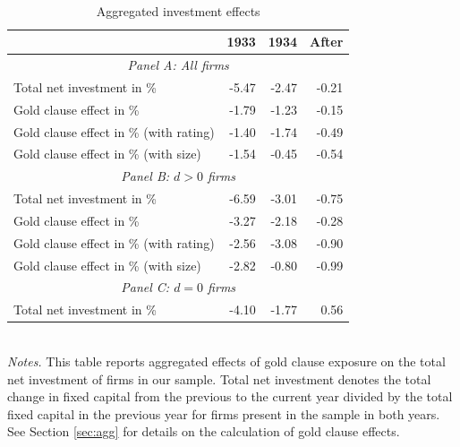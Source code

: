 \begin{table}[p]\centering
\caption{\\Aggregated investment effects}\footnotesize
\label{tab:agg}
\begin{tabular}{lrrr}
\toprule
& 1933 & 1934 & After \\
\midrule
\multicolumn{4}{c}{\textit{Panel A: All firms}}\\
\midrule
Total net investment in \%                 & -5.47 & -2.47 & -0.21 \\
Gold clause effect in \%                 & -1.79 & -1.23 & -0.15 \\
Gold clause effect in \% (with rating)   & -1.40 & -1.74 & -0.49 \\
Gold clause effect in \% (with size)     & -1.54 & -0.45 & -0.54 \\
\midrule
\multicolumn{4}{c}{\textit{Panel B: $d>0$ firms}}\\
\midrule
Total net investment in \%                  & -6.59 & -3.01 & -0.75 \\
Gold clause effect in \%                 & -3.27 & -2.18 & -0.28 \\
Gold clause effect in \% (with rating)   & -2.56 & -3.08 & -0.90 \\
Gold clause effect in \% (with size)     & -2.82 & -0.80 & -0.99 \\
\midrule
\multicolumn{4}{c}{\textit{Panel C: $d=0$ firms}}\\
\midrule
Total net investment in \%                  & -4.10 & -1.77 & 0.56 \\
\bottomrule

\end{tabular}\\

\vspace*{3mm} \justifying \noindent
\footnotesize{\textit{Notes.} This table reports aggregated effects of gold clause exposure on the total net investment of firms in our sample. Total net investment denotes the total change in fixed capital from the previous to the current year divided by the total fixed capital in the previous year for firms present in the sample in both years. See Section \ref{sec:agg} for details on the calculation of gold clause effects.}
\end{table}
